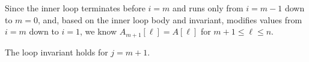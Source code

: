 \begin{enumerate}
\begin{solution}
Since the inner loop terminates before $i=m$ and runs only from $i=m-1$ down to $m=0$, and, based on the inner loop body and invariant, modifies values from $i=m$ down to $i=1$, we know $A_{m+1}[\ell]=A[\ell]$ for $m+1\leq\ell\leq n$.

The loop invariant holds for $j=m+1$.
\end{solution}
\end{enumerate}
